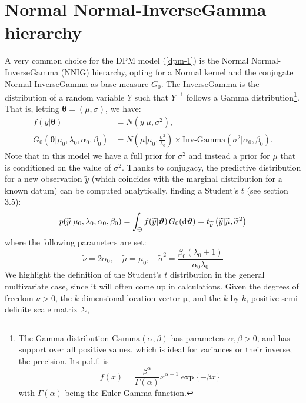 \section{Normal Normal-InverseGamma hierarchy} \label{nnig}
A very common choice for the DPM model (\ref{dpm-1}) is the Normal Normal-InverseGamma (NNIG) hierarchy, opting for a Normal kernel and the conjugate Normal-InverseGamma as base measure $G_0$.
The InverseGamma is the distribution of a random variable $Y$ such that $Y^{-1}$ follows a Gamma distribution\footnote{The Gamma distribution $\text{Gamma}(\alpha,\beta)$ has parameters $\alpha,\beta > 0$, and has support over all positive values, which is ideal for variances or their inverse, the precision.
Its p.d.f. is
$$f(x) = \frac{\beta^\alpha}{\Gamma(\alpha)} x^{\alpha-1} \exp\{-\beta x\}$$
with $\Gamma(\alpha)$ being the Euler-Gamma function.}.
That is, letting $\boldsymbol\theta=(\mu,\sigma)$, we have:
\begin{equation}
	\begin{aligned}
		f(y|\boldsymbol\theta)&=N(y| \mu ,\sigma^2),  \\
		G_0(\boldsymbol\theta|\mu_0,\lambda_0, \alpha_0, 	\beta_0)
		&=N\left(\mu | \mu_0 ,\frac{\sigma^2} {\lambda_0}\right) \times \text{Inv-Gamma}(\sigma^2|\alpha_0, \beta_0 ).
	\end{aligned}
\end{equation}
Note that in this model we have a full prior for $\sigma^2$ and instead a prior for $\mu$ that is conditioned on the value of $\sigma^2$.
Thanks to conjugacy, the predictive distribution for a new observation $\widetilde{y}$ (which coincides with the marginal distribution for a known datum) can be computed analytically, finding a Student's $t$ (see \cite{integral} section 3.5):
\begin{align*}
	p(\widetilde{y}|\mu_0,\lambda_0, \alpha_0, \beta_0) =
	\int_\Theta f(\widetilde{y}|\boldsymbol{\vartheta}) \, G_0(\mathrm d\boldsymbol{\vartheta}) =
	t_{\widetilde \nu}\left(\widetilde{y}|\widetilde{\mu},\widetilde{\sigma}^2\right)
\end{align*}
where the following parameters are set:
$$
	\widetilde{\nu}=2 \alpha_0, \quad
	\widetilde{\mu}=\mu_0, \quad
	\widetilde{\sigma}^2= \frac{\beta_0(\lambda_0+1)}{\alpha_0 \lambda_0}
$$
We highlight the definition of the Student's $t$ distribution in the general multivariate case, since it will often come up in calculations.
Given the degrees of freedom $\nu > 0$, the $k$-dimensional location vector $\boldsymbol\mu$, and the $k$-by-$k$, positive semi-definite scale matrix $\Sigma$,
